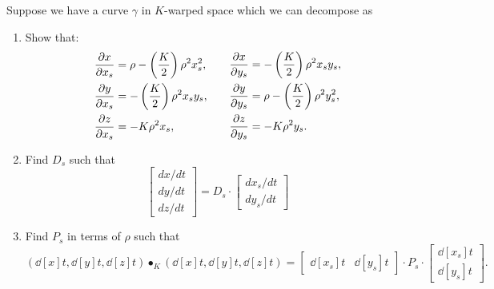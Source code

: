 \documentclass[newpage,hints,handout,12pt,noauthor,nooutcomes]{ximera}
\begin{document}
\begin{problem}
  Suppose we have a curve $\gamma$ in $K$-warped space which we can
decompose as

\begin{center}
\end{center}

\begin{enumerate}
\item Show that:
\[
  \begin{split}
    \pp[x]{x_s} &=\rho-\left(\frac{K}{2}\right)\rho^2x_s^2,\\
    \pp[y]{x_s} &=-\left(\frac{K}{2}\right)\rho^2x_sy_s,\\
    \pp[z]{x_s} &=-K\rho^2x_s,
  \end{split}
  \qquad
  \begin{split}
    \pp[x]{y_s} &= -\left(\frac{K}{2}\right)\rho^2x_sy_s,\\
    \pp[y]{y_s} &=\rho-\left(\frac{K}{2}\right)\rho^2y_s^2,\\
    \pp[z]{y_s} &= -K\rho^2y_s.
  \end{split}
  \]
  \item Find $D_s$ such that
  \[
  \begin{bmatrix}
    dx/dt \\ dy/dt \\ dz/dt
  \end{bmatrix}
  =D_s \cdot
  \begin{bmatrix}
    dx_s/dt \\ dy_s/dt
  \end{bmatrix}
  \]
\item Find $P_s$ in terms of $\rho$ such that
  \[
  \left(\dd[x]{t}, \dd[y]{t}, \dd[z]{t}\right)\bullet_K
  \left(\dd[x]{t}, \dd[y]{t}, \dd[z]{t}\right)
  =
  \begin{bmatrix}
    \dd[x_s]{t} &  \dd[y_s]{t}
  \end{bmatrix}
  \cdot P_s
  \cdot
  \begin{bmatrix}
    \dd[x_s]{t} \\  \dd[y_s]{t}
  \end{bmatrix}.
  \]
\end{enumerate}


\end{problem}
\end{document}

